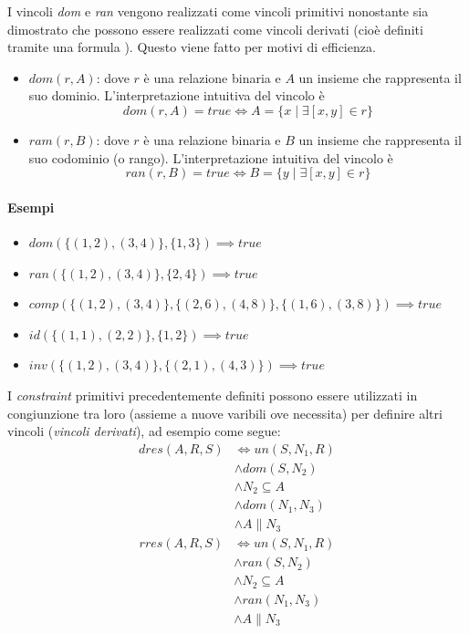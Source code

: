 \documentclass[12pt,a4paper,openright]{book} %
\begin{document}
I vincoli \textit{dom} e \textit{ran} vengono realizzati come vincoli primitivi nonostante sia dimostrato che possono essere realizzati come vincoli derivati (cioè definiti tramite una formula \lbr{}). Questo viene fatto per motivi di efficienza.

\begin{itemize}
\item $dom(r, A)$: dove $r$ è una relazione binaria e $A$ un insieme che rappresenta il suo dominio. L’interpretazione intuitiva del vincolo è
\[
    dom(r, A) = true 
      \Longleftrightarrow 
    A = \{x \mid \exists [x,y] \in r\}
\]

\item $ram(r, B)$: dove $r$ è una relazione binaria e $B$ un insieme che rappresenta il suo codominio (o rango). L’interpretazione intuitiva del vincolo è
\[
    ran(r, B) = true 
      \Longleftrightarrow 
    B = \{y \mid \exists [x,y] \in r\}
\]
\end{itemize}

\paragraph{Esempi}
\begin{itemize}
\item $dom(\{(1,2), (3,4)\}, \{1,3\}) \implies true$
\item $ran(\{(1,2), (3,4)\}, \{2,4\}) \implies true$
\item $comp(\{(1,2), (3,4)\}, \{(2,6), (4,8)\}, \{(1,6), (3,8)\}) \implies true$
\item $id(\{(1,1), (2,2)\}, \{1,2\}) \implies true$
\item $inv(\{(1,2), (3,4)\}, \{(2,1), (4,3)\}) \implies true$
\end{itemize}

\phantom{a}
I \textit{constraint} primitivi precedentemente definiti possono essere utilizzati in congiunzione tra loro (assieme a nuove varibili ove necessita) per definire altri vincoli (\textit{vincoli derivati}), ad esempio come segue:
\begin{equation}
\begin{split}
dres(A, R, S) & \Longleftrightarrow un(S, N_1, R) \\ 
  & \land dom(S, N_2) \\
  & \land N_2 \subseteq A \\
  & \land dom(N_1, N_3) \\
  & \land A \parallel N_3
\end{split}
\end{equation}
\begin{equation}
\begin{split}
rres(A, R, S) & \Longleftrightarrow un(S, N_1, R) \\ 
  & \land ran(S, N_2) \\
  & \land N_2 \subseteq A \\
  & \land ran(N_1, N_3) \\
  & \land A \parallel N_3
\end{split}
\end{equation}
\end{document}
